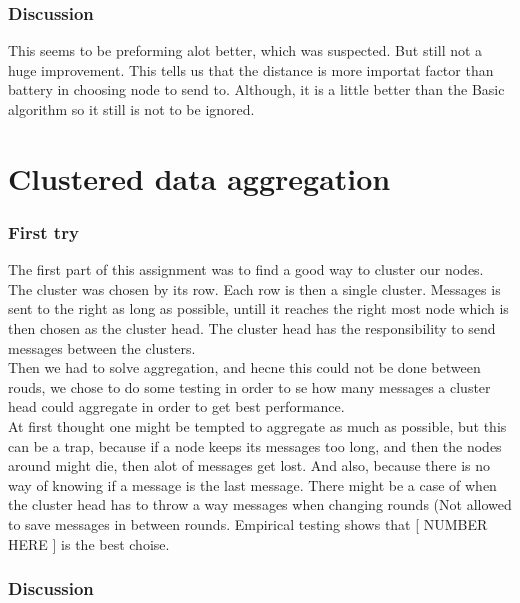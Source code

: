 \documentclass{article}
\begin{document}
    \section{Discussion}
      This seems to be preforming alot better, which was suspected. But still not a huge
      improvement. This tells us that the distance is more importat factor than battery
      in choosing node to send to. Although, it is a little better than the Basic algorithm
      so it still is not to be ignored.
\part{Clustered data aggregation}
  \section{First try}
    The first part of this assignment was to find a good way to cluster our nodes.
    The cluster was chosen by its row. Each row is then a single cluster. Messages
    is sent to the right as long as possible, untill it reaches the right most
    node which is then chosen as the cluster head. The cluster head has the 
    responsibility to send messages between the clusters.\\
    Then we had to solve aggregation, and hecne this could not be done between
    rouds, we chose to do some testing in order to se how many messages a cluster
    head could aggregate in order to get best performance.\\
    At first thought one might be tempted to aggregate as much as possible, but
    this can be a trap, because if a node keeps its messages too long, and then 
    the nodes around might die, then alot of messages get lost. And also, because
    there is no way of knowing if a message is the last message. There might be 
    a case of when the cluster head has to throw a way messages when changing 
    rounds (Not allowed to save messages in between rounds. Empirical testing 
    shows that [ NUMBER HERE ] is the best choise.
    
    
  \section{Discussion}
    
  
\end{document}
